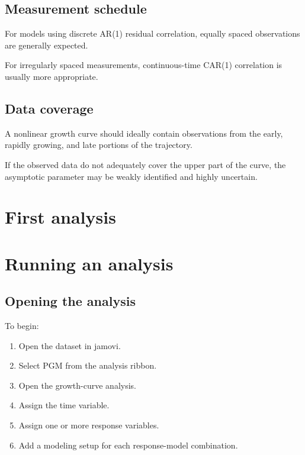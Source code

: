 \documentclass[
  english,
  letterpaper,
  DIV=11,
  numbers=noendperiod]{scrreprt}
\begin{document}
\section{Measurement schedule}\label{measurement-schedule}

For models using discrete AR(1) residual correlation, equally spaced
observations are generally expected.

For irregularly spaced measurements, continuous-time CAR(1) correlation
is usually more appropriate.

\section{Data coverage}\label{data-coverage}

A nonlinear growth curve should ideally contain observations from the
early, rapidly growing, and late portions of the trajectory.

If the observed data do not adequately cover the upper part of the
curve, the asymptotic parameter may be weakly identified and highly
uncertain.


\chapter{First analysis}\label{first-analysis}


\chapter{Running an analysis}\label{running-an-analysis}

\section{Opening the analysis}\label{opening-the-analysis}

To begin:

\begin{enumerate}
\def\labelenumi{\arabic{enumi}.}
\item
  Open the dataset in jamovi.
\item
  Select PGM from the analysis ribbon.
\item
  Open the growth-curve analysis.
\item
  Assign the time variable.
\item
  Assign one or more response variables.
\item
  Add a modeling setup for each response-model combination.
\end{enumerate}
\end{document}
